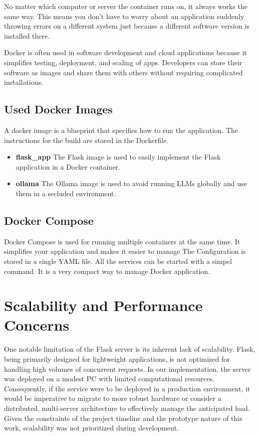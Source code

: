 No matter which computer or server the container runs on, it always works the same way. This means you don’t have to worry about an application suddenly throwing errors on a different system just because a different software version is installed there.

Docker is often used in software development and cloud applications because it simplifies testing, deployment, and scaling of apps. Developers can store their software as images and share them with others without requiring complicated installations.

\subsection{Used Docker Images}
A docker image is a blueprint that specifies how to run the application. The instructions for the build are stored in the Dockerfile.
\cite{dockerize_flask} 

\begin{itemize}
    \item \textbf{flask\_app} The Flask image is used to easily implement the Flask application in a Docker container.
    \item \textbf{ollama} The Ollama image is used to avoid running LLMs globally and use them in a secluded environment.
\end{itemize}

\subsection{Docker Compose}
Docker Compose is used for running multiple containers at the same time. It simplifies your application and makes it easier to manage 
The Configuration is stored in a single YAML file. All the services can be started with a simpel command. It is a very compact way to manage Docker application.
\cite{docker_compose} 

\author{Florian Prandstetter}

\section{Scalability and Performance Concerns}

One notable limitation of the Flask server is its inherent lack of scalability. Flask, being primarily designed for lightweight applications, is not optimized for handling high volumes of concurrent requests. In our implementation, the server was deployed on a modest PC with limited computational resources. Consequently, if the service were to be deployed in a production environment, it would be imperative to migrate to more robust hardware or consider a distributed, multi-server architecture to effectively manage the anticipated load. Given the constraints of the project timeline and the prototype nature of this work, scalability was not prioritized during development.

